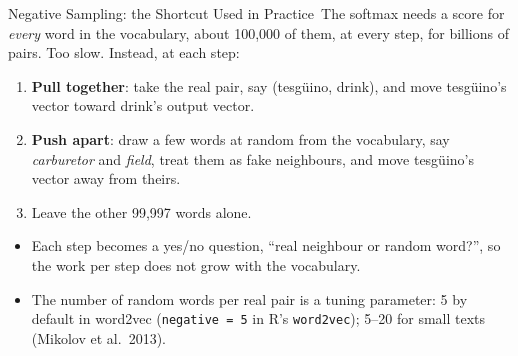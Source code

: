 \documentclass[aspectratio=169,11pt,xcolor=dvipsnames]{beamer}
\newcommand{\srcp}[1]{{\scriptsize\color{gray}(#1)}}
\newcommand{\adv}{\,\raisebox{0.6pt}{\textcolor{accent}{$\bigstar$}}}
\begin{document}
\begin{frame}{Negative Sampling: the Shortcut Used in Practice\adv}
The softmax needs a score for \emph{every} word in the vocabulary, about 100,000 of them, at every step,
for billions of pairs. Too slow. Instead, at each step:
\vskip4pt
\begin{enumerate}\itemsep5pt
  \item \textbf{Pull together}: take the real pair, say (tesg\"uino, drink), and move tesg\"uino's vector
        toward drink's output vector.
  \item \textbf{Push apart}: draw a few words at random from the vocabulary, say \emph{carburetor} and
        \emph{field}, treat them as fake neighbours, and move tesg\"uino's vector away from theirs.
  \item Leave the other 99,997 words alone.
\end{enumerate}
\vskip4pt
\begin{itemize}\itemsep3pt
  \item Each step becomes a yes/no question, ``real neighbour or random word?'', so the work per step
        does not grow with the vocabulary.
  \item The number of random words per real pair is a tuning parameter: 5 by default in word2vec
        (\texttt{negative = 5} in R's \texttt{word2vec}); 5--20 for small texts \srcp{Mikolov et al.\ 2013}.
\end{itemize}
\end{frame}
\end{document}
